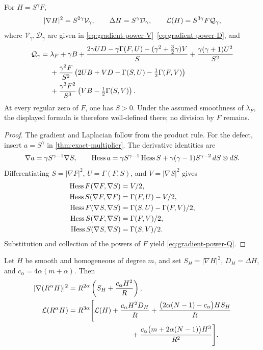 \begin{proposition}
\label{prop:gradient-power-identity}
For \(H=S^\gamma F\),
\[
 |\nabla H|^2=S^{2\gamma}\mathcal V_\gamma,\qquad
 \Delta H=S^\gamma\mathcal D_\gamma,\qquad
 \mathcal L(H)=S^{3\gamma}F\mathcal Q_\gamma,
\]
where \(\mathcal V_\gamma,\mathcal D_\gamma\) are given in
\eqref{eq:gradient-power-V}--\eqref{eq:gradient-power-D}, and
\begin{align}
 \mathcal Q_\gamma={}&\lambda_F+\gamma B
 +\frac{2\gamma UD-\gamma\Gamma(F,U)
                 -(\gamma^2+\tfrac32\gamma)V}{S}
 +\frac{\gamma(\gamma+1)U^2}{S^2}\notag\\
 &+\frac{\gamma^2F}{S^2}
       \left(2UB+VD-\Gamma(S,U)-\tfrac12\Gamma(F,V)\right)\notag\\
 &+\frac{\gamma^3F^2}{S^3}
       \left(VB-\tfrac12\Gamma(S,V)\right).
 \label{eq:gradient-power-Q}
\end{align}
At every regular zero of \(F\), one has \(S>0\). Under the assumed
smoothness of \(\lambda_F\), the displayed formula is therefore
well-defined there; no division by \(F\) remains.
\end{proposition}

\begin{proof}
The gradient and Laplacian follow from the product rule.
For the defect, insert \(a=S^\gamma\) in
\cref{thm:exact-multiplier}.  The derivative identities are
\[
 \nabla a=\gamma S^{\gamma-1}\nabla S,\qquad
 \operatorname{Hess} a=\gamma S^{\gamma-1}\operatorname{Hess} S
       +\gamma(\gamma-1)S^{\gamma-2}\,dS\otimes dS.
\]
Differentiating \(S=|\nabla F|^2\), \(U=\Gamma(F,S)\), and
\(V=|\nabla S|^2\) gives
\begin{align*}
 \operatorname{Hess} F(\nabla F,\nabla S)&=V/2,\\
 \operatorname{Hess} S(\nabla F,\nabla F)&=\Gamma(F,U)-V/2,\\
 \operatorname{Hess} F(\nabla S,\nabla S)&=\Gamma(S,U)-\Gamma(F,V)/2,\\
 \operatorname{Hess} S(\nabla F,\nabla S)&=\Gamma(F,V)/2,\\
 \operatorname{Hess} S(\nabla S,\nabla S)&=\Gamma(S,V)/2.
\end{align*}
Substitution and collection of the powers of \(F\) yield
\eqref{eq:gradient-power-Q}.
\end{proof}

\begin{proposition}
\label{prop:radial-master-identity}
Let \(H\) be smooth and homogeneous of degree \(m\), and set
\(S_H=|\nabla H|^2\), \(D_H=\Delta H\), and
\(c_\alpha=4\alpha(m+\alpha)\).  Then
\begin{align}
 |\nabla(R^\alpha H)|^2
 &=R^{2\alpha}\left(S_H+\frac{c_\alpha H^2}{R}\right),
 \label{eq:radial-master-gradient}\\
 \cL(R^\alpha H)
 &=R^{3\alpha}\Biggl[\cL(H)
  +\frac{c_\alpha H^2D_H}{R}
  +\frac{\bigl(2\alpha(N-1)-c_\alpha\bigr)HS_H}{R}\notag\\
 &\hspace{31mm}
  +\frac{c_\alpha\bigl(m+2\alpha(N-1)\bigr)H^3}{R^2}
  \Biggr].
 \label{eq:radial-master-L}
\end{align}
\end{proposition}

